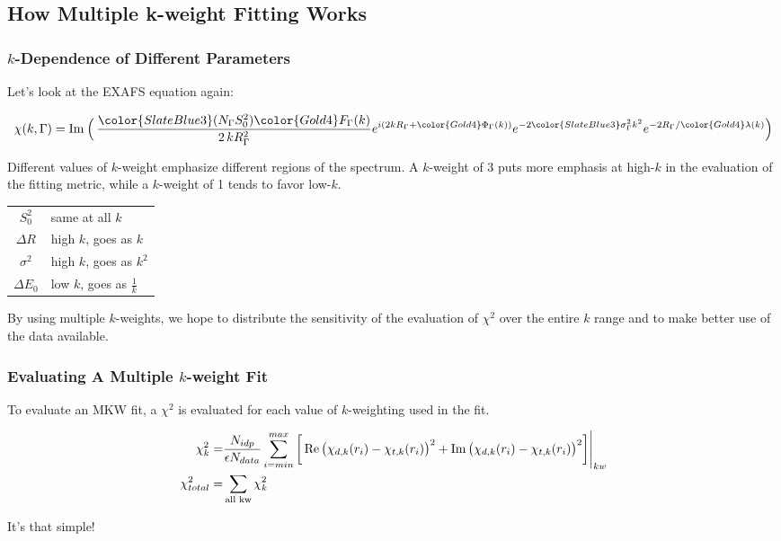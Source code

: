 \documentclass[10pt, xcolor=x11names, compress]{beamer}
\begin{document}
\subsection[Explain]{How Multiple k-weight Fitting Works}
\begin{frame}
  \frametitle{$k$-Dependence of Different Parameters}

  Let's look at the EXAFS equation again:

  {\small
    \begin{equation}
      \chi(k,\Gamma) = {\Im}\>\Bigl(\, %
      { \frac{{\color{SlateBlue3}(N_\Gamma S_0^2)}{\color{Gold4}F_\Gamma(k)}}
        {2\,kR_\Gamma^2} }
      e^{i(2kR_\Gamma + {\color{Gold4}\Phi_\Gamma(k)})}
      e^{-2{\color{SlateBlue3}\sigma_\Gamma^2}k^2}
      e^{-2R_\Gamma/{\color{Gold4}\lambda(k)}}
      \Bigl) \notag
    \end{equation}}

  Different values of $k$-weight emphasize different regions of the
  spectrum. A $k$-weight of 3 puts more emphasis at high-$k$ in the
  evaluation of the fitting metric, while a $k$-weight of 1 tends to
  favor low-$k$.

  \begin{center}
    \begin{tabular}{cl}
      {\color{SlateBlue3}$S_0^2$}      &  same at all $k$ \\
      {\color{SlateBlue3}$\Delta R$}   & high $k$, goes as $k$ \\
      {\color{SlateBlue3}$\sigma^2$}   & high $k$, goes as $k^2$ \\
      {\color{SlateBlue3}$\Delta E_0$} & low $k$, goes as $\frac{1}{k}$ \\
    \end{tabular}
  \end{center}

  By using multiple $k$-weights, we hope to distribute the sensitivity
  of the evaluation of $\chi^2$ over the entire $k$ range and to make
  better use of the data available.
\end{frame}

\begin{frame}
  \frametitle{Evaluating A Multiple $k$-weight Fit}

  To evaluate an MKW fit, a $\chi^2$ is evaluated for each value of
  $k$-weighting used in the fit.
  
  {\small
    \begin{align}
      \chi^2_k =& \frac{N_{idp}}{\epsilon N_{data}}
      \sum\limits_{i=min}^{max} 
      \bigg[\Re\big(\chi_{d,k}(r_i)-\chi_{t,k}(r_i)\big)^2 + 
      \Im\big(\chi_{d,k}(r_i)-\chi_{t,k}(r_i)\big)^2\bigg]\Biggl|_{kw}
      \notag \\
      \chi^2_{total} =& \sum\limits_{\textrm{all kw}} \chi^2_k
    \end{align}}

  \begin{exampleblock}{}
    \begin{center}
      It's that simple!
    \end{center}
  \end{exampleblock}
\end{frame}
\end{document}
